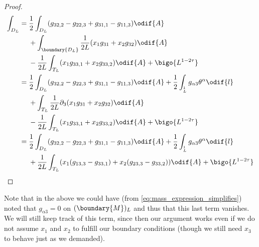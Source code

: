 \documentclass[titlepage,numbers=noenddot,oneside,%
cleardoublepage=empty,paper=a4,fontsize=11pt,%
english,%
]{scrartcl}
\let\sphere\relax
\newcommand{\sphere}{\mathbb{S}}
\begin{document}
\begin{proof}
\begin{equation*}
\begin{aligned}[t]
            \int_{D_L}&=\begin{aligned}[t]
                &\frac{1}{2}\int_{D_L}(g_{32,2}-g_{22,3}+g_{31,1}-g_{11,3})\odif{A}\\
                &+\int_{\boundary{D_L}}\frac{1}{2L}(x_1g_{31}+x_2g_{32})\odif{A}\\
                &-\frac{1}{2L}\int_{T_L}(x_1 g_{33,1}+x_2 g_{33,2})\odif{A}+\bigo{L^{1-2\tau}}
            \end{aligned}\\
            &=\begin{aligned}[t]
                &\frac{1}{2}\int_{D_L}(g_{32,2}-g_{22,3}+g_{31,1}-g_{11,3})\odif{A}+\frac{1}{2}\int_{\sphere^1_L}g_{\alpha 3}\theta^{\alpha}\odif{l}\\
                &+\int_{T_L}\frac{1}{2L}\partial_3(x_1g_{31}+x_2g_{32})\odif{A}\\
                &-\frac{1}{2L}\int_{T_L}(x_1 g_{33,1}+x_2 g_{33,2})\odif{A}+\bigo{L^{1-2\tau}}
            \end{aligned}\\
            &=\begin{aligned}[t]
                &\frac{1}{2}\int_{D_L}(g_{32,2}-g_{22,3}+g_{31,1}-g_{11,3})\odif{A}+\frac{1}{2}\int_{\sphere^1_L}g_{\alpha 3}\theta^{\alpha}\odif{l}\\
                &+\frac{1}{2L}\int_{T_L}(x_1 (g_{13,3}-g_{33,1})+x_2 (g_{23,3}-g_{33,2}))\odif{A}+\bigo{L^{1-2\tau}}
            \end{aligned}
        \end{aligned}
    \end{equation*}
\end{proof}
Note that in the above we could have (from \cref{eq:mass_expression_simplifies}) noted that \( g_{\alpha 3}=0 \) on \( (\boundary{M})_L \) and thus that this last term vanishes. We will still keep track of this term, since then our argument works even if we do not assume \( x_1 \) and \( x_2 \) to fulfill our boundary conditions (though we still need \( x_3 \) to behave just as we demanded).
\end{document}
